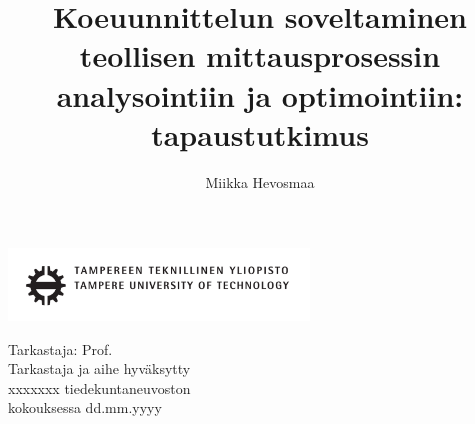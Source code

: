 \documentclass[12pt,a4paper,finnish]{tutthesis}
\author{Miikka Hevosmaa}
\title{Koeuunnittelun soveltaminen teollisen mittausprosessin analysointiin ja optimointiin: tapaustutkimus}      %
\begin{document}
\thispagestyle{empty}
\vspace*{-1cm}\noindent
\includegraphics[width=8cm]{tty_tut_logo}   %



\vspace{6.8cm}
\maketitle
\vspace{6.cm} %

\begin{flushright}  
  \begin{minipage}[c]{6.8cm}
    \begin{spacing}{1.0}
      \textsf{Tarkastaja: Prof. \@examiner}\\
      \textsf{Tarkastaja ja aihe hyväksytty}\\ 
      \textsf{xxxxxxx tiedekuntaneuvoston}\\
      \textsf{kokouksessa dd.mm.yyyy}\\
    \end{spacing}
  \end{minipage}
\end{flushright}

\if@twoside
\clearpage
\fi
\end{document}

